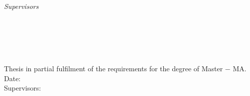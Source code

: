 \begin{titlepage}
	\vfill
	\begin{minipage}[t]{.27\textwidth}
		\raggedleft
		\textit{Supervisors}
	\end{minipage}
	\hspace*{15pt}
	\begin{minipage}[t]{.65\textwidth}
		\thesisFirstSupervisor
	\end{minipage} \\[10mm]

	\thesisDate \\

\end{titlepage}


\hfill
\vfill
{
	\small
	\textbf{\thesisName} \\
	\textit{\thesisTitle} \\
	Thesis in partial fulfilment of the requirements for the degree of Master − MA. \\
	Date: \thesisDate \\
	Supervisors: \thesisFirstSupervisor \\[1.5em]
	\textbf{\thesisUniversity} \\
	\thesisUniversityInstitute \\
	\thesisUniversityStreetAddress \\
	\thesisUniversityPostalCode\ \thesisUniversityCity
}
